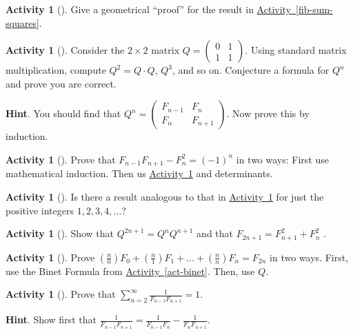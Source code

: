 \documentclass[10pt,]{book}
\theoremstyle{plain}
\theoremstyle{definition}
\theoremstyle{definition}
\theoremstyle{definition}
\newtheorem{activity}[project]{Activity}
\numberwithin{equation}{chapter}
\newcommand{\amp}{&}
\begin{document}
\begin{activity}[]\label{activity-148}
\hypertarget{p-969}{}%
Give a geometrical ``proof'' for the result in \hyperref[fib-sum-squares]{Activity~\ref{fib-sum-squares}}.%
\end{activity}
\begin{activity}[]\label{fib-matrix}
\hypertarget{p-970}{}%
Consider the \(2\times 2\) matrix \(Q = 
\begin{pmatrix}
0 \amp 1\\
1 \amp 1
\end{pmatrix}.\) Using standard matrix multiplication, compute \(Q^2 = Q\cdot Q\), \(Q^3\), and so on.  Conjecture a formula for \(Q^n\) and prove you are correct.%
\par\smallskip%
\noindent\textbf{Hint}.\hypertarget{hint-110}{}\quad%
\hypertarget{p-971}{}%
You should find that \(Q^n = \begin{pmatrix}
F_{n - 1} \amp F_{n}\\
F_{n} \amp F_{n + 1}
\end{pmatrix}\).  Now prove this by induction.%
\end{activity}
\begin{activity}[]\label{fib-neg-one}
\hypertarget{p-972}{}%
Prove that \(F_{n - 1}F_{n + 1} - F_{n}^{2} = (-1)^{n}\) in two ways:  First use mathematical induction.  Then us \hyperref[fib-matrix]{Activity~\ref{fib-matrix}} and determinants.%
\end{activity}
\begin{activity}[]\label{activity-151}
\hypertarget{p-973}{}%
Is there a result analogous to that in \hyperref[fib-neg-one]{Activity~\ref{fib-neg-one}} for just the positive integers \(1, 2, 3, 4, \ldots\)?%
\end{activity}
\begin{activity}[]\label{activity-152}
\hypertarget{p-974}{}%
Show that \(Q^{2n + 1} = Q^{n}Q^{n+1}\) and that \(F_{2n + 1} = F_{n + 1}^{2} + F_{n}^{2}\) .%
\end{activity}
\begin{activity}[]\label{activity-153}
\hypertarget{p-975}{}%
Prove \(\left( \frac{n}{0} \right)F_{0} + \left( \frac{n}{1} \right)F_{1} + \ldots + \left( \frac{n}{n} \right)F_{n} = F_{2n}\) in two ways.  First, use the Binet Formula from \hyperref[act-binet]{Activity~\ref{act-binet}}.  Then, use \(Q\).%
\end{activity}
\begin{activity}[]\label{activity-154}
\hypertarget{p-976}{}%
Prove that \(\sum_{n = 2}^{\infty}\frac{1}{F_{n - 1}F_{n + 1}} = 1\).%
\par\smallskip%
\noindent\textbf{Hint}.\hypertarget{hint-111}{}\quad%
\hypertarget{p-977}{}%
Show first that \(\frac{1}{F_{n - 1}F_{n + 1}} = \frac{1}{F_{n - 1}F_{n}} -
\frac{1}{F_{n}F_{n + 1}}\).%
\end{activity}
\end{document}
